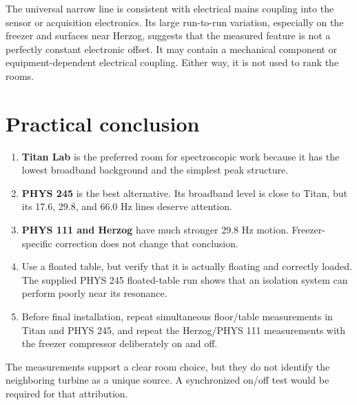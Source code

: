 \documentclass[11pt]{article}
\begin{document}
The universal narrow line is consistent with electrical mains coupling into
the sensor or acquisition electronics. Its large run-to-run variation,
especially on the freezer and surfaces near Herzog, suggests that the measured
feature is not a perfectly constant electronic offset. It may contain a
mechanical component or equipment-dependent electrical coupling. Either way,
it is not used to rank the rooms.

\section{Practical conclusion}

\begin{enumerate}
  \item \textbf{Titan Lab} is the preferred room for spectroscopic work because
        it has the lowest broadband background and the simplest peak structure.
  \item \textbf{PHYS 245} is the best alternative. Its broadband level is close
        to Titan, but its 17.6, 29.8, and 66.0 Hz lines deserve attention.
  \item \textbf{PHYS 111 and Herzog} have much stronger 29.8 Hz motion.
        Freezer-specific correction does not change that conclusion.
  \item Use a floated table, but verify that it is actually floating and
        correctly loaded. The supplied PHYS 245 floated-table run shows that
        an isolation system can perform poorly near its resonance.
  \item Before final installation, repeat simultaneous floor/table
        measurements in Titan and PHYS 245, and repeat the Herzog/PHYS 111
        measurements with the freezer compressor deliberately on and off.
\end{enumerate}

The measurements support a clear room choice, but they do not identify the
neighboring turbine as a unique source. A synchronized on/off test would be
required for that attribution.
\end{document}
